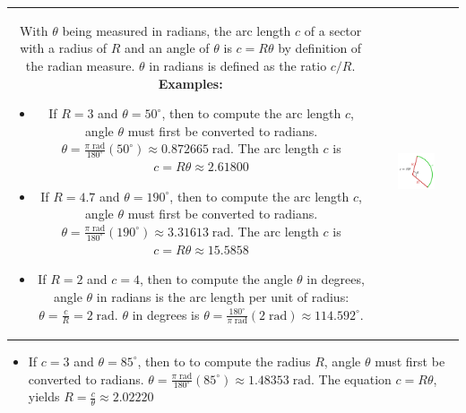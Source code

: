 \documentclass{article}
\begin{document}
\begin{tabular}{cc}
\parbox{0.5\textwidth}{
With \(\theta\) being measured in radians, the arc length \(c\) of a sector with a radius of \(R\) and an angle of \(\theta\) is \(c = R\theta\) by definition of the radian measure. \(\theta\) in radians is defined as the ratio \(c/R\). \\
\textbf{Examples:}
\begin{itemize}
\item If \(R = 3\) and \(\theta = 50^\circ\), then to compute the arc length \(c\), angle \(\theta\) must first be converted to radians. \(\theta = \frac{\pi\;\text{rad}}{180^\circ}(50^\circ) \approx 0.872665\;\text{rad}\). The arc length \(c\) is \(c = R\theta \approx 2.61800\)
\item If \(R = 4.7\) and \(\theta = 190^\circ\), then to compute the arc length \(c\), angle \(\theta\) must first be converted to radians. \(\theta = \frac{\pi\;\text{rad}}{180^\circ}(190^\circ) \approx 3.31613\;\text{rad}\). The arc length \(c\) is \(c = R\theta \approx 15.5858\)
\item If \(R = 2\) and \(c = 4\), then to compute the angle \(\theta\) in degrees, angle \(\theta\) in radians is the arc length per unit of radius: \(\theta = \frac{c}{R} = 2\;\text{rad}\). \(\theta\) in degrees is \(\theta = \frac{180^\circ}{\pi\;\text{rad}}(2\;\text{rad}) \approx 114.592^\circ\).
\end{itemize}
} & \parbox{0.5\textwidth}{
\includegraphics[width = 0.5\textwidth]{arc_length}
}
\end{tabular}
\begin{itemize}
\item If \(c = 3\) and \(\theta = 85^\circ\), then to to compute the radius \(R\), angle \(\theta\) must first be converted to radians. \(\theta = \frac{\pi\;\text{rad}}{180^\circ}(85^\circ) \approx 1.48353\;\text{rad}\). The equation \(c = R\theta\), yields \(R = \frac{c}{\theta} \approx 2.02220\)
\end{itemize}
\end{document}
